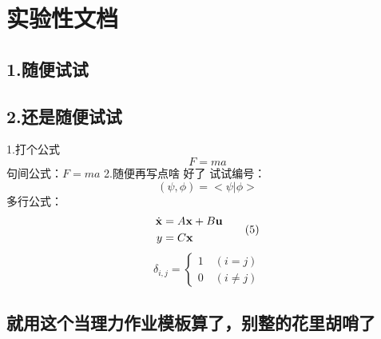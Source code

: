 \documentclass[
]{article}
\author{}
\date{}
\begin{document}
\hypertarget{ux5b9eux9a8cux6027ux6587ux6863}{%
\section{实验性文档}\label{ux5b9eux9a8cux6027ux6587ux6863}}

\hypertarget{1ux968fux4fbfux8bd5ux8bd5}{%
\subsection{1.随便试试}\label{1ux968fux4fbfux8bd5ux8bd5}}

\hypertarget{2ux8fd8ux662fux968fux4fbfux8bd5ux8bd5}{%
\subsection{2.还是随便试试}\label{2ux8fd8ux662fux968fux4fbfux8bd5ux8bd5}}

1.打个公式
\[F=ma\]
句间公式：\(F=ma\)
2.随便再写点啥
好了
试试编号：
\[(\psi,\phi)=<\psi|\phi>\tag{1}\]
多行公式：
\[
	\begin{aligned}
	\dot{\bf x}&=A\mathbf x+B\bf u\\
	y&=C\bf x
	\end{aligned}\tag{5}
\]
\[
\delta_{i,j}=\begin{cases}
	1\quad(i=j)\\
	0\quad(i\neq j)
\end{cases}\tag{7}
\]
\subsection{就用这个当理力作业模板算了，别整的花里胡哨了}
\end{document}
